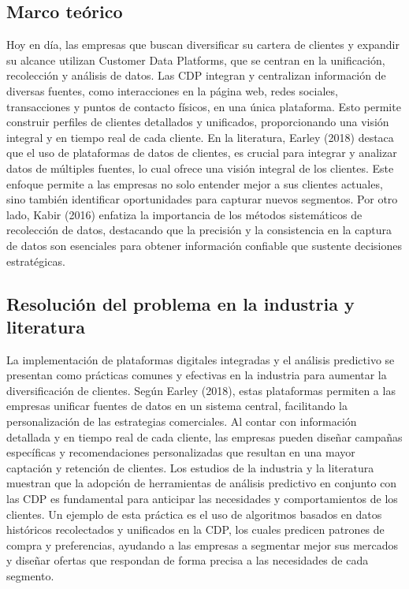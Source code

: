 \documentclass[12pt]{article}
\begin{document}
\subsection{Marco teórico}
\noindent
Hoy en día, las empresas que buscan diversificar su cartera de clientes y expandir su alcance utilizan Customer Data Platforms, que se centran en la unificación, recolección y análisis de datos. Las CDP integran y centralizan información de diversas fuentes, como interacciones en la página web, redes sociales, transacciones y puntos de contacto físicos, en una única plataforma. Esto permite construir perfiles de clientes detallados y unificados, proporcionando una visión integral y en tiempo real de cada cliente. 
En la literatura, Earley (2018) destaca que el uso de plataformas de datos de clientes, es crucial para integrar y analizar datos de múltiples fuentes, lo cual ofrece una visión integral de los clientes. Este enfoque permite a las empresas no solo entender mejor a sus clientes actuales, sino también identificar oportunidades para capturar nuevos segmentos. Por otro lado, Kabir (2016) enfatiza la importancia de los métodos sistemáticos de recolección de datos, destacando que la precisión y la consistencia en la captura de datos son esenciales para obtener información confiable que sustente decisiones estratégicas.

\subsection{Resolución del problema en la industria y literatura}
\noindent
La implementación de plataformas digitales integradas y el análisis predictivo se presentan como prácticas comunes y efectivas en la industria para aumentar la diversificación de clientes. Según Earley (2018), estas plataformas permiten a las empresas unificar fuentes de datos en un sistema central, facilitando la personalización de las estrategias comerciales. Al contar con información detallada y en tiempo real de cada cliente, las empresas pueden diseñar campañas específicas y recomendaciones personalizadas que resultan en una mayor captación y retención de clientes.
Los estudios de la industria y la literatura muestran que la adopción de herramientas de análisis predictivo en conjunto con las CDP es fundamental para anticipar las necesidades y comportamientos de los clientes. Un ejemplo de esta práctica es el uso de algoritmos basados en datos históricos recolectados y unificados en la CDP, los cuales predicen patrones de compra y preferencias, ayudando a las empresas a segmentar mejor sus mercados y diseñar ofertas que respondan de forma precisa a las necesidades de cada segmento.
\end{document}
